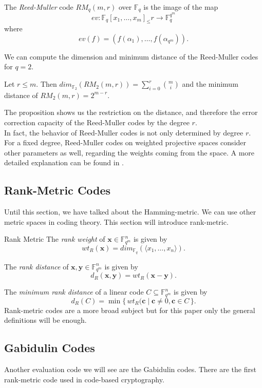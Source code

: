 \begin{definition}
The \textit{Reed-Muller} code $RM_q(m, r)$ over $\mathbb{F}_q$ is the image of the map
\[
ev:\mathbb{F}_q[x_1, \dots, x_m]_\leq r \xrightarrow{} \mathbb{F}_q^{q^m}
\]
where
\[
ev(f) = (f(\alpha_1), \dots, f(\alpha_{q^m})).
\]
\end{definition}

We can compute the dimension and minimum distance of the Reed-Muller codes for $q = 2$.

\begin{proposition}
Let $r \leq m$. Then $dim_{\mathbb{F}_2}(RM_2(m, r)) = 
\sum_{i=0}^r {m\choose i}$ and the minimum distance of $RM_2(m, r) = 2^{m-r}$.
\end{proposition}

The proposition shows us the restriction on the distance, and therefore the error correction capacity of the Reed-Muller codes by the degree $r$.\\
In fact, the behavior of Reed-Muller codes is not only determined by degree $r$. For a fixed degree, Reed-Muller codes on weighted projective spaces consider other parameters as well, regarding the weights coming from the space. A more detailed explanation can be found in \cite{WPS2023}.

\subsection{Rank-Metric Codes}

Until this section, we have talked about the Hamming-metric. We can use other metric spaces in coding theory. This section will introduce rank-metric.

\begin{definition}{Rank Metric}
The \textit{rank weight} of $\mathbf{x}\in \mathbb{F}_{q^m}^n$ is given by
\[
wt_R(\mathbf{x}) = dim_{\mathbb{F}_q}(\langle x_1,\dots,x_n\rangle).
\]

The \textit{rank distance} of $\mathbf{x},\mathbf{y}\in \mathbb{F}_{q^m}^n$ is given by
\[
d_R(\mathbf{x},\mathbf{y})=wt_R(\mathbf{x}-\mathbf{y}).
\]

The \textit{minimum rank distance} of a linear code $C\subseteq \mathbb{F}_{q^m}^n$ is given by
\[
d_R(C)=\min\{\,wt_R(\mathbf{c}\mid\mathbf{c}\neq0, \mathbf{c}\in C\,\}.
\]
Rank-metric codes are a more broad subject but for this paper only the general definitions will be enough.    
\end{definition}

\subsection{Gabidulin Codes}
Another evaluation code we will see are the Gabidulin codes. There are the first rank-metric code used in code-based cryptography.

